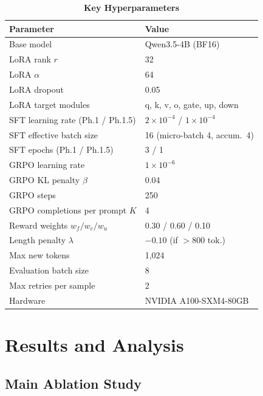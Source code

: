 \documentclass{ieeeaccess}
\newcommand{\basemodelname}{Qwen3.5-4B}
\begin{document}
\begin{table}[t]
\caption{\textbf{Key Hyperparameters}}
\label{tab:hyper}
\centering
\setlength{\tabcolsep}{5pt}
\begin{tabular}{ll}
\toprule
\textbf{Parameter}                  & \textbf{Value} \\
\midrule
Base model                          & \basemodelname{} (BF16) \\
LoRA rank $r$                       & 32 \\
LoRA $\alpha$                       & 64 \\
LoRA dropout                        & 0.05 \\
LoRA target modules                 & q, k, v, o, gate, up, down \\
SFT learning rate (Ph.1 / Ph.1.5)   & $2\times10^{-4}$ / $1\times10^{-4}$ \\
SFT effective batch size            & 16 (micro-batch 4, accum.\ 4) \\
SFT epochs (Ph.1 / Ph.1.5)         & 3 / 1 \\
GRPO learning rate                  & $1\times10^{-6}$ \\
GRPO KL penalty $\beta$             & 0.04 \\
GRPO steps                          & 250 \\
GRPO completions per prompt $K$     & 4 \\
Reward weights $w_f/w_c/w_u$        & 0.30 / 0.60 / 0.10 \\
Length penalty $\lambda$            & $-0.10$ (if $>$800 tok.) \\
Max new tokens                      & 1,024 \\
Evaluation batch size               & 8 \\
Max retries per sample              & 2 \\
Hardware                            & NVIDIA A100-SXM4-80GB \\
\bottomrule
\end{tabular}
\end{table}

\section{Results and Analysis}
\label{sec:results}

\subsection{Main Ablation Study}
\end{document}

